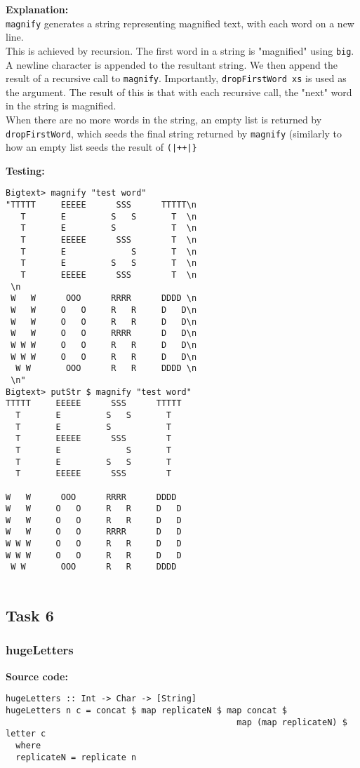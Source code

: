 \documentclass[11pt]{article}
\begin{document}
{\textbf{Explanation:}\\
{\verb|magnify|} generates a string representing magnified text, with each word on a new line.\\

This is achieved by recursion. The first word in a string is "magnified" using {\verb|big|}. A newline character is appended to the resultant string. We then append the result of a recursive call to {\verb|magnify|}. Importantly, {\verb|dropFirstWord xs|} is used as the argument. The result of this is that with each recursive call, the "next" word in the string is magnified. \\

When there are no more words in the string, an empty list is returned by {\verb|dropFirstWord|}, which seeds the final string returned by {\verb|magnify|} (similarly to how an empty list seeds the result of {\verb=(|++|}=}

\newpage
\textbf{Testing:}
\begin{verbatim}
Bigtext> magnify "test word" 
"TTTTT     EEEEE      SSS      TTTTT\n
   T       E         S   S       T  \n  
   T       E         S           T  \n  
   T       EEEEE      SSS        T  \n  
   T       E             S       T  \n  
   T       E         S   S       T  \n  
   T       EEEEE      SSS        T  \n
 \n
 W   W      OOO      RRRR      DDDD \n
 W   W     O   O     R   R     D   D\n
 W   W     O   O     R   R     D   D\n
 W   W     O   O     RRRR      D   D\n
 W W W     O   O     R   R     D   D\n
 W W W     O   O     R   R     D   D\n 
  W W       OOO      R   R     DDDD \n
 \n"
Bigtext> putStr $ magnify "test word" 
TTTTT     EEEEE      SSS      TTTTT
  T       E         S   S       T  
  T       E         S           T  
  T       EEEEE      SSS        T  
  T       E             S       T  
  T       E         S   S       T  
  T       EEEEE      SSS        T  

W   W      OOO      RRRR      DDDD 
W   W     O   O     R   R     D   D
W   W     O   O     R   R     D   D
W   W     O   O     RRRR      D   D
W W W     O   O     R   R     D   D
W W W     O   O     R   R     D   D
 W W       OOO      R   R     DDDD 


\end{verbatim}

\newpage
\subsection{Task 6}
\subsubsection{hugeLetters}
\textbf{Source code:}
\begin{verbatim}
hugeLetters :: Int -> Char -> [String]
hugeLetters n c = concat $ map replicateN $ map concat $
                                              map (map replicateN) $ letter c
  where                                                                                  
  replicateN = replicate n
\end{verbatim}

}
\end{document}
